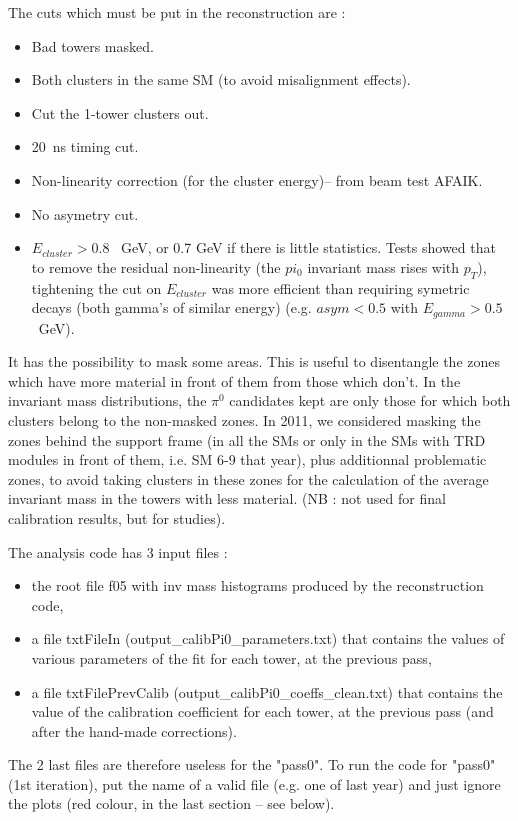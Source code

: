 The cuts which must be put in the reconstruction are :
\begin{itemize}
\item Bad towers masked.
\item Both clusters in the same SM (to avoid misalignment effects).
\item Cut the 1-tower clusters out.
\item 20~ns timing cut.
\item Non-linearity correction (for the cluster energy)-- from beam test AFAIK.
\item No asymetry cut.
\item $E_{cluster} > 0.8$ ~GeV, or 0.7 GeV if there is little statistics. Tests showed that to remove the residual non-linearity (the $pi_{0}$ invariant mass rises with $p_{T}$), tightening the cut on $E_{cluster}$ was more efficient than requiring symetric decays (both gamma's of similar energy) (e.g. $asym < 0.5$ with $E_{gamma} > 0.5$~GeV).
\end{itemize}
It has the possibility to mask some areas. This is useful to disentangle the zones which have more material in front of them from those which don't. In the invariant mass distributions, the $\pi^{0}$ candidates kept are only those for which both clusters belong to the non-masked zones. In 2011, we considered masking the zones behind the support frame (in all the SMs or only in the SMs with TRD modules in front of them, i.e. SM 6-9 that year), plus additionnal problematic zones, to avoid taking clusters in these zones for the calculation of the average invariant mass in the towers with less material. (NB : not used for final calibration results, but for studies).

The analysis code has 3 input files :
\begin{itemize}
\item the root file f05 with inv mass histograms produced by the reconstruction code,
\item a file txtFileIn (output\_calibPi0\_parameters.txt) that contains the values of various parameters of the fit for each tower, at the previous pass,
\item a file txtFilePrevCalib (output\_calibPi0\_coeffs\_clean.txt) that contains the value of the calibration coefficient for each tower, at the previous pass (and after the hand-made corrections).
\end{itemize}
The 2 last files are therefore useless for the "pass0". To run the code for "pass0" (1st iteration), put the name of a valid file (e.g. one of last year) and just ignore the plots (red colour, in the last section -- see below).

